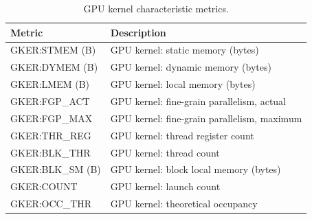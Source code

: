 \begin{table}[h]
\centering
\begin{tabular}{|l|l|}\hline
Metric & Description\\\hline\hline
GKER:STMEM (B) & GPU kernel: static memory (bytes)    \\\hline
GKER:DYMEM (B) & GPU kernel: dynamic memory (bytes)   \\\hline
GKER:LMEM (B) & GPU kernel: local memory (bytes)    \\\hline
GKER:FGP\_ACT & GPU kernel: fine-grain parallelism, actual    \\\hline
GKER:FGP\_MAX & GPU kernel: fine-grain parallelism, maximum    \\\hline
GKER:THR\_REG & GPU kernel: thread register count    \\\hline
GKER:BLK\_THR & GPU kernel: thread count   \\\hline
GKER:BLK\_SM (B) & GPU kernel: block local memory (bytes)   \\\hline
GKER:COUNT & GPU kernel: launch count   \\\hline
GKER:OCC\_THR & GPU kernel: theoretical occupancy    \\\hline
\end{tabular}
\caption{GPU kernel characteristic metrics.}
\label{table:gker}
\end{table}

